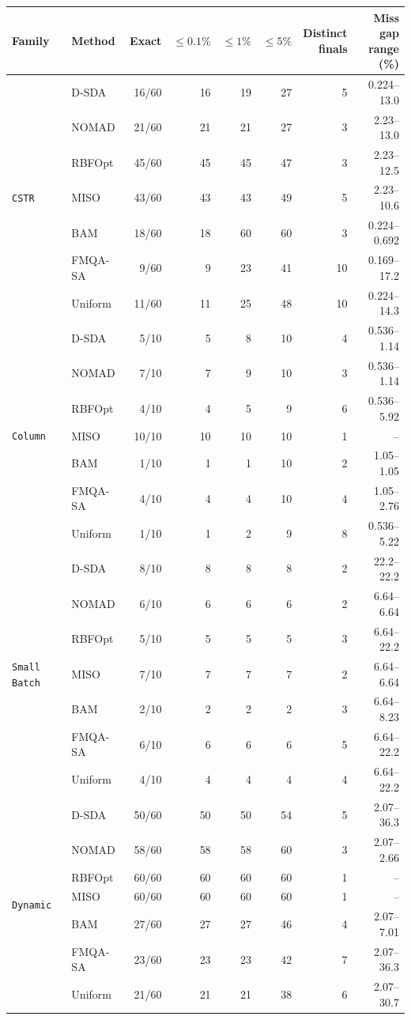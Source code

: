 \begin{tabular}{llrrrrrr}\toprule
Family & Method & Exact & \(\leq0.1\%\) & \(\leq1\%\) & \(\leq5\%\) & \makecell{Distinct\\finals} & \makecell{Miss gap\\range (\%)}\\\midrule
\multirow{7}{*}{\texttt{CSTR}} & D-SDA & 16/60 & 16 & 19 & 27 & 5 & 0.224--13.0 \\
 & NOMAD & 21/60 & 21 & 21 & 27 & 3 & 2.23--13.0 \\
 & RBFOpt & 45/60 & 45 & 45 & 47 & 3 & 2.23--12.5 \\
 & MISO & 43/60 & 43 & 43 & 49 & 5 & 2.23--10.6 \\
 & BAM & 18/60 & 18 & 60 & 60 & 3 & 0.224--0.692 \\
 & FMQA-SA & 9/60 & 9 & 23 & 41 & 10 & 0.169--17.2 \\
 & Uniform & 11/60 & 11 & 25 & 48 & 10 & 0.224--14.3 \\
\midrule
\multirow{7}{*}{\texttt{Column}} & D-SDA & 5/10 & 5 & 8 & 10 & 4 & 0.536--1.14 \\
 & NOMAD & 7/10 & 7 & 9 & 10 & 3 & 0.536--1.14 \\
 & RBFOpt & 4/10 & 4 & 5 & 9 & 6 & 0.536--5.92 \\
 & MISO & 10/10 & 10 & 10 & 10 & 1 & -- \\
 & BAM & 1/10 & 1 & 1 & 10 & 2 & 1.05--1.05 \\
 & FMQA-SA & 4/10 & 4 & 4 & 10 & 4 & 1.05--2.76 \\
 & Uniform & 1/10 & 1 & 2 & 9 & 8 & 0.536--5.22 \\
\midrule
\multirow{7}{*}{\texttt{Small Batch}} & D-SDA & 8/10 & 8 & 8 & 8 & 2 & 22.2--22.2 \\
 & NOMAD & 6/10 & 6 & 6 & 6 & 2 & 6.64--6.64 \\
 & RBFOpt & 5/10 & 5 & 5 & 5 & 3 & 6.64--22.2 \\
 & MISO & 7/10 & 7 & 7 & 7 & 2 & 6.64--6.64 \\
 & BAM & 2/10 & 2 & 2 & 2 & 3 & 6.64--8.23 \\
 & FMQA-SA & 6/10 & 6 & 6 & 6 & 5 & 6.64--22.2 \\
 & Uniform & 4/10 & 4 & 4 & 4 & 4 & 6.64--22.2 \\
\midrule
\multirow{7}{*}{\texttt{Dynamic}} & D-SDA & 50/60 & 50 & 50 & 54 & 5 & 2.07--36.3 \\
 & NOMAD & 58/60 & 58 & 58 & 60 & 3 & 2.07--2.66 \\
 & RBFOpt & 60/60 & 60 & 60 & 60 & 1 & -- \\
 & MISO & 60/60 & 60 & 60 & 60 & 1 & -- \\
 & BAM & 27/60 & 27 & 27 & 46 & 4 & 2.07--7.01 \\
 & FMQA-SA & 23/60 & 23 & 23 & 42 & 7 & 2.07--36.3 \\
 & Uniform & 21/60 & 21 & 21 & 38 & 6 & 2.07--30.7 \\
\bottomrule
\end{tabular}
